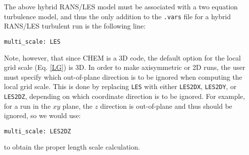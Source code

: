 The above hybrid RANS/LES model must be associated with a two equation
turbulence model, and thus the only addition to the \verb!.vars! file
for a hybrid RANS/LES turbulent run is the following line:
\begin{verbatim}
multi_scale: LES
\end{verbatim}
Note, however, that since CHEM is a 3D code, the default option for
the local grid scale (Eq. \ref{LG}) is 3D.  In order to make
axisymmetric or 2D runs, the user must specify which out-of-plane
direction is to be ignored when computing the local grid scale.  This
is done by replacing \verb!LES! with either \verb!LES2DX!,
\verb!LES2DY!, or \verb!LES2DZ!, depending on which coordinate
direction is to be ignored.  For example, for a run in the $xy$ plane,
the $z$ direction is out-of-plane and thus should be ignored, so we
would use:
\begin{verbatim}
multi_scale: LES2DZ
\end{verbatim}
to obtain the proper length scale calculation.


